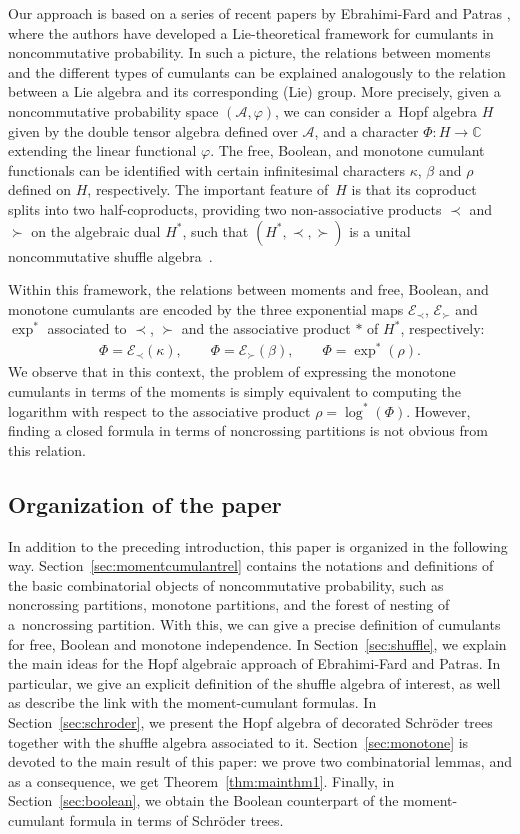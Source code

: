 \documentclass[pdftex]{sigma}%
\numberwithin{equation}{section}
\newcommand{\A}{\mathcal{A}}
\begin{document}
Our approach is based on a series of recent papers by Ebrahimi-Fard and Patras \cite{EFP1,EFP2,EFP3,EFP4,EFP5}, where the authors have developed a Lie-theoretical framework for cumulants in noncommutative probability. In such a picture, the relations between moments and the different types of cumulants can be explained analogously to the relation between a Lie algebra and its corresponding (Lie) group. More precisely, given a noncommutative probability space $(\A,\varphi)$, we can consider a~Hopf algebra $H$ given by the double tensor algebra defined over $\A$, and a character $\Phi\colon H \to \mathbb{C}$ extending the linear functional $\varphi$. The free, Boolean, and monotone cumulant functionals can be identified with certain infinitesimal characters $\kappa$, $\beta$ and $\rho$ defined on $H$, respectively. The important feature of~$H$ is that its coproduct splits into two half-coproducts, providing two non-associative products $\prec$ and $\succ$ on the algebraic dual $H^*$, such that $(H^*,\prec,\succ)$ is a unital noncommutative shuffle algebra~\cite{EFP1}.

Within this framework, the relations between moments and free, Boolean, and monotone cumulants are encoded by the three exponential maps $\mathcal{E}_\prec$, $\mathcal{E}_\succ$ and $\exp^*$ associated to $\prec$, $\succ$ and the associative product $*$ of $H^*$, respectively:
\begin{gather*}
\Phi = \mathcal{E}_\prec(\kappa),
\qquad \Phi = \mathcal{E}_{\succ}(\beta),
\qquad \Phi = \exp^*(\rho).
\end{gather*}
We observe that in this context, the problem of expressing the monotone cumulants in terms of the moments is simply equivalent to computing the logarithm with respect to the associative product $\rho = \log^*(\Phi).$ However, finding a closed formula in terms of noncrossing partitions is not obvious from this relation.

\subsection*{Organization of the paper} In addition to the preceding introduction, this paper is organized in the following way. Section~\ref{sec:momentcumulantrel} contains the notations and definitions of the basic combinatorial objects of noncommutative probability, such as noncrossing partitions, monotone partitions, and the forest of nesting of a~noncrossing partition. With this, we can give a precise definition of cumulants for free, Boolean and monotone independence. In Section~\ref{sec:shuffle}, we explain the main ideas for the Hopf algebraic approach of Ebrahimi-Fard and Patras. In particular, we give an explicit definition of the shuffle algebra of interest, as well as describe the link with the moment-cumulant formulas. In Section~\ref{sec:schroder}, we present the Hopf algebra of decorated Schr\"oder trees together with the shuffle algebra associated to it. Section~\ref{sec:monotone} is devoted to the main result of this paper: we prove two combinatorial lemmas, and as a consequence, we get Theorem~\ref{thm:mainthm1}. Finally, in Section~\ref{sec:boolean}, we obtain the Boolean counterpart of the moment-cumulant formula in terms of Schr\"oder trees.
\end{document}

